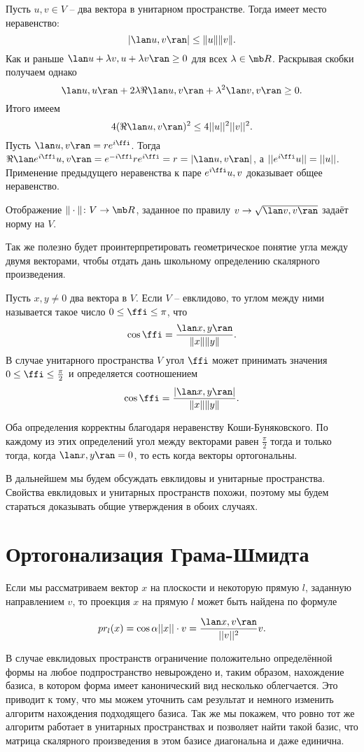 \lm Пусть $u,v \in V$ -- два вектора в унитарном пространстве. Тогда имеет место неравенство:
$$|\lan u,v\ran| \leq \|u\| \|v\|.$$
\proof Как и раньше  $\lan u+\lambda v, u+\lambda v\ran \geq 0$ для всех $\lambda \in \mb R$. Раскрывая скобки получаем однако $$\lan u,u\ran +2\lambda \Re\lan u,v\ran +\lambda^2\lan v,v\ran\geq 0.$$  Итого имеем  $$4(\Re\lan u,v\ran)^2 \leq 4 ||u||^2||v||^2.$$
Пусть $\lan u ,v \ran = r e^{i\ffi}$. Тогда $\Re \lan  e^{i\ffi}u , v \ran= e^{-i\ffi} r e^{i\ffi}=r=|\lan u,v\ran|$, а $||e^{i\ffi}u||=||u||$. Применение предыдущего неравенства  к паре $e^{i\ffi} u, v$ доказывает общее неравенство.
\endproof
\elm

\crl Отображение $\|\cdot\| \colon V \to \mb R$, заданное по правилу $v\to \sqrt{\lan v,v\ran}$ задаёт  норму на $V$.
\ecrl


Так же полезно будет проинтерпретировать геометрическое понятие угла между двумя векторами, чтобы отдать дань школьному определению скалярного произведения.

\dfn Пусть $x,y\neq 0$ два вектора в $V$. Если $V$ -- евклидово, то углом между ними называется такое число $0\leq\ffi\leq \pi$, что 
$$\cos\ffi = \frac{\lan x,y\ran}{\|x\| \|y\|}.$$
В случае унитарного пространства $V$ угол $\ffi$ может принимать значения $0\leq \ffi \leq \frac{\pi}{2}$ и определяется соотношением
$$\cos\ffi = \frac{|\lan x,y\ran|}{\|x\| \|y\|}.$$
\edfn

Оба определения корректны благодаря неравенству Коши-Буняковского. По каждому из этих определений угол между векторами равен $\frac{\pi}{2}$ тогда и только тогда, когда $\lan x,y 
\ran=0$, то есть когда векторы ортогональны. 

В дальнейшем мы будем обсуждать  евклидовы и унитарные пространства. Свойства евклидовых и унитарных пространств похожи, поэтому  мы будем стараться доказывать общие утверждения в обоих случаях.



\section{Ортогонализация Грама-Шмидта}

Если мы рассматриваем вектор $x$ на плоскости и некоторую прямую $l$, заданную направлением $v$, то проекция $x$ на прямую $l$ может быть найдена по формуле 

$$pr_l(x)=\cos \alpha  ||x|| \cdot v= \frac{\lan x,v\ran}{||v||^2} v.$$

В случае евклидовых пространств ограничение положительно определённой формы на любое подпространство невырождено и, таким образом, нахождение базиса, в котором форма имеет канонический вид несколько облегчается.  Это приводит к тому, что мы можем уточнить сам результат и немного изменить алгоритм нахождения подходящего базиса. Так же мы покажем, что ровно тот же алгоритм работает в унитарных пространствах и позволяет найти такой базис, что матрица скалярного произведения в этом базисе диагональна и даже единична.

